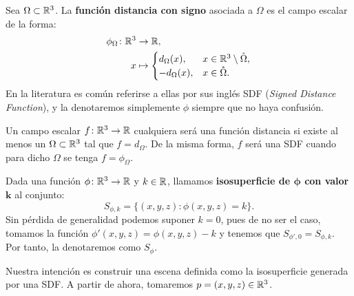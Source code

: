 \begin{definicion}\label{d:sdf}
  Sea $\Omega \subset \mathbb{R}^3$. La \textbf{función distancia con signo} asociada a $\Omega$ es el campo escalar de la forma:
  \begin{align*}
          \phi_{\Omega} \colon \mathbb{R}^3 &\to \mathbb{R},\\
          x &\mapsto \begin{cases}
      d_{\Omega}(x),  &x\in \mathbb{R}^3\setminus \mathring{\Omega}, \\
      -d_{\Omega}(x), &x\in \mathring{\Omega}.
    \end{cases}
    \end{align*}
  En la literatura es común referirse a ellas por sus inglés SDF (\textit{Signed Distance Function}), y la denotaremos simplemente $\phi$ siempre que no haya confusión.
\end{definicion}

 \begin{observacion}
     Un campo escalar $f\colon \mathbb{R}^3\to \mathbb{R}$ cualquiera será una función distancia si existe al menos un $\Omega \subset \mathbb{R}^3$ tal que $f = d_{\Omega}$. De la misma forma, $f$ será una SDF cuando para dicho $\Omega$ se tenga $f=\phi_{\Omega}$.
 \end{observacion}

\begin{definicion}
  Dada una función $\phi\colon \mathbb{R}^3 \to \mathbb{R}$ y $k\in\mathbb{R}$, llamamos \textbf{isosuperficie de $\boldsymbol{\phi}$ con valor $\boldsymbol{k}$} al conjunto:
  \begin{equation*}
      S_{\phi,k} = \{(x,y,z) :  \phi(x,y,z)=k\}.
  \end{equation*}
  Sin pérdida de generalidad podemos suponer $k=0$, pues de no ser el caso, tomamos la función $\phi'(x,y,z)=\phi(x,y,z)-k$ y tenemos que $S_{\phi',0} = S_{\phi,k}$. Por tanto, la denotaremos como $S_\phi$.
\end{definicion}

Nuestra intención es construir una escena definida como la isosuperficie generada por una SDF. A partir de ahora, tomaremos $p=(x,y,z)\in\mathbb{R}^3$.

